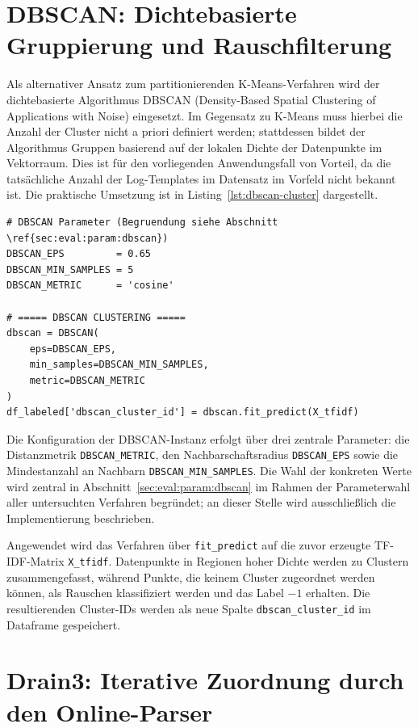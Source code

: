 \section{DBSCAN: Dichtebasierte Gruppierung und Rauschfilterung}

Als alternativer Ansatz zum partitionierenden K-Means-Verfahren wird der
dichtebasierte Algorithmus DBSCAN (Density-Based Spatial Clustering of
Applications with Noise) eingesetzt. Im Gegensatz zu K-Means muss hierbei die
Anzahl der Cluster nicht a priori definiert werden; stattdessen bildet der
Algorithmus Gruppen basierend auf der lokalen Dichte der Datenpunkte im
Vektorraum. Dies ist für den vorliegenden Anwendungsfall von Vorteil, da die
tatsächliche Anzahl der Log-Templates im Datensatz im Vorfeld nicht bekannt ist.
Die praktische Umsetzung ist in Listing~\ref{lst:dbscan-cluster} dargestellt.

\begin{lstlisting}[caption={Clustern mit DBSCAN}, label={lst:dbscan-cluster}]
# DBSCAN Parameter (Begruendung siehe Abschnitt \ref{sec:eval:param:dbscan})
DBSCAN_EPS         = 0.65
DBSCAN_MIN_SAMPLES = 5
DBSCAN_METRIC      = 'cosine'

# ===== DBSCAN CLUSTERING =====
dbscan = DBSCAN(
    eps=DBSCAN_EPS,
    min_samples=DBSCAN_MIN_SAMPLES,
    metric=DBSCAN_METRIC
)
df_labeled['dbscan_cluster_id'] = dbscan.fit_predict(X_tfidf)
\end{lstlisting}

Die Konfiguration der DBSCAN-Instanz erfolgt über drei zentrale Parameter:
die Distanzmetrik \texttt{DBSCAN\_METRIC}, den Nachbarschaftsradius
\texttt{DBSCAN\_EPS} sowie die Mindestanzahl an Nachbarn
\texttt{DBSCAN\_MIN\_SAMPLES}. Die Wahl der konkreten Werte wird zentral in
Abschnitt~\ref{sec:eval:param:dbscan} im Rahmen der Parameterwahl aller
untersuchten Verfahren begründet; an dieser Stelle wird ausschließlich die
Implementierung beschrieben.

Angewendet wird das Verfahren über \texttt{fit\_predict} auf die zuvor erzeugte
TF-IDF-Matrix \texttt{X\_tfidf}. Datenpunkte in Regionen hoher Dichte werden zu
Clustern zusammengefasst, während Punkte, die keinem Cluster zugeordnet werden
können, als Rauschen klassifiziert werden und das Label $-1$ erhalten. Die
resultierenden Cluster-IDs werden als neue Spalte \texttt{dbscan\_cluster\_id}
im Dataframe gespeichert.


\section{Drain3: Iterative Zuordnung durch den Online-Parser}
\label{sec:real:drain3}

